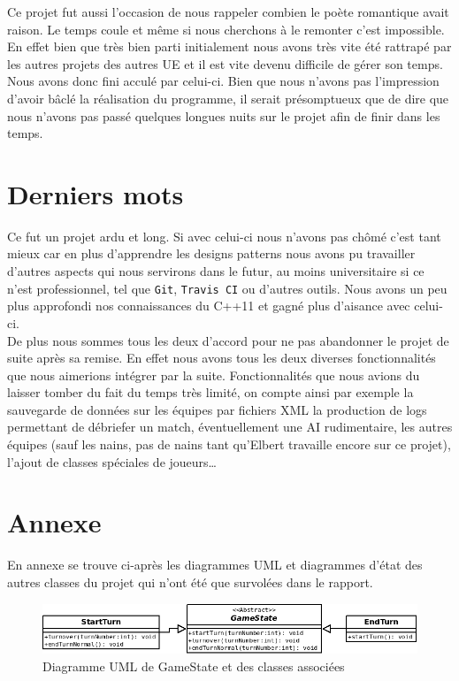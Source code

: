 \documentclass{article}
\newcommand{\info}{\texttt}
\begin{document}
            Ce projet fut aussi l'occasion de nous rappeler combien le poète romantique avait raison. Le temps coule et même si nous cherchons à le remonter c'est impossible. En effet bien que très bien parti initialement nous avons très vite été rattrapé par les autres projets des autres UE et il est vite devenu difficile de gérer son temps. Nous avons donc fini acculé par celui-ci. Bien que nous n'avons pas l'impression d'avoir bâclé la réalisation du programme, il serait présomptueux que de dire que nous n'avons pas passé quelques longues nuits sur le projet afin de finir dans les temps. 
    
\section{Derniers mots}

    Ce fut un projet ardu et long. Si avec celui-ci nous n'avons pas chômé c'est tant mieux car en plus d'apprendre les designs patterns nous avons pu travailler d'autres aspects qui nous servirons dans le futur, au moins universitaire si ce n'est professionnel, tel que \info{Git}, \info{Travis CI} ou d'autres outils. Nous avons un peu plus approfondi nos connaissances du C++11 et gagné plus d'aisance avec celui-ci.\\
    De plus nous sommes tous les deux d'accord pour ne pas abandonner le projet de suite après sa remise. En effet nous avons tous les deux diverses fonctionnalités que nous aimerions intégrer par la suite. Fonctionnalités que nous avions du laisser tomber du fait du temps très limité, on compte ainsi par exemple la sauvegarde de données sur les équipes par fichiers XML la production de logs permettant de débriefer un match, éventuellement une AI rudimentaire, les autres équipes (sauf les nains, pas de nains tant qu'Elbert travaille encore sur ce projet), l'ajout de classes spéciales de joueurs\dots

\newpage
\appendix

\section{Annexe}

    \label{annexe}En annexe se trouve ci-après les diagrammes UML et diagrammes d'état des autres classes du projet qui n'ont été que survolées dans le rapport.

    \begin{figure}[H]
        \centerline{\includegraphics[scale=0.5]{img/GameState.png}}
        \caption{\label{DiaGameState} Diagramme UML de GameState et des classes associées}
    \end{figure}
    
\end{document}
